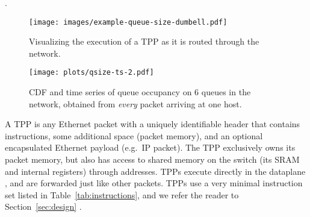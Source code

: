 .

\begin{figure*}[htb]
\centering
\begin{subfigure}[b]{0.40\textwidth}
\texttt{[image: images/example-queue-size-dumbell.pdf]}
\caption{Visualizing the execution of a TPP as it is
  routed through the network.}\label{fig:tpp-qsize-example-topo}
\end{subfigure}\quad
\begin{subfigure}[b]{0.40\textwidth}
\texttt{[image: plots/qsize-ts-2.pdf]}
\caption{CDF and time series of queue occupancy on 6 queues in
  the network, obtained from \emph{every} packet arriving at one
  host.}\label{fig:tpp-qsize-example-queues}
\end{subfigure}
\caption{TPPs enable end-hosts to measure queue occupancy evolution at
  a packet granularity allowing them to detect micro-bursts, which are
  the spikes in the time series of queue occupancy (bottom of Figure~\ref{fig:tpp-qsize-example-queues}).
  Notice from the CDF (top) that one of the queues is empty for 80\% of the time instants when
  packet arrives to the queue; a sampling method is likely to miss the bursts.}
\label{fig:tpp-qsize-example}
\end{figure*}




  A TPP is any Ethernet packet with a
uniquely identifiable header that contains instructions, some
additional space (packet memory), and an optional encapsulated
Ethernet payload (e.g.\ IP packet).  The TPP exclusively owns its
packet memory, but also has access to shared memory on the switch (its
SRAM and internal registers) through addresses.  TPPs execute directly
in the dataplane , and are forwarded just like other
packets.  TPPs use a very minimal instruction set listed in
Table~\ref{tab:instructions}, and we refer the reader to
Section~\ref{sec:design} .

